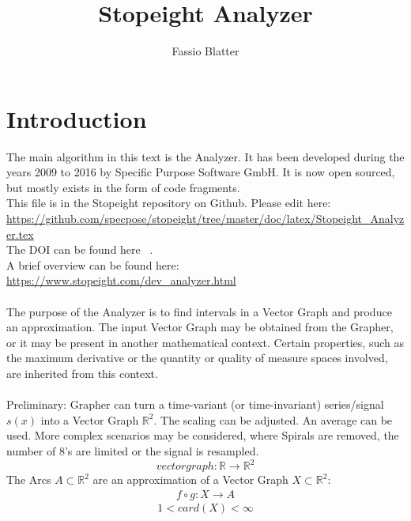 \documentclass{report}
\begin{document}
\title{Stopeight Analyzer}
\author{Fassio Blatter}
\maketitle

\chapter{Introduction}
The main algorithm in this text is the Analyzer. It has been developed during the years 2009 to 2016 by Specific Purpose Software GmbH. It is now open sourced, but mostly exists in the form of code fragments.\\
This file is in the Stopeight repository on Github. Please edit here:\\
\href{https://github.com/specpose/stopeight/tree/master/doc/latex/Stopeight\_Analyzer.tex}{https://github.com/specpose/stopeight/tree/master/doc/latex/Stopeight\_Analyzer.tex}\\
The DOI can be found here ~\cite{Stopeight}.\\
A brief overview can be found here:\\
\href{https://www.stopeight.com/dev_analyzer.html}{https://www.stopeight.com/dev\_analyzer.html}\\\\
The purpose of the Analyzer is to find intervals in a Vector Graph and produce an approximation. The input Vector Graph may be obtained from the Grapher, or it may be present in another mathematical context. Certain properties, such as the maximum derivative or the quantity or quality of measure spaces involved, are inherited from this context.\\\\
Preliminary: Grapher can turn a time-variant (or time-invariant) series/signal $s(x)$ into a Vector Graph $\mathbb{R}^2$. The scaling can be adjusted. An average can be used. More complex scenarios may be considered, where Spirals are removed, the number of 8's are limited or the signal is resampled.
\begin{equation}
vectorgraph: \mathbb{R} \rightarrow \mathbb{R}^2
\end{equation}
The Arcs $A \subset \mathbb{R}^2$ are an approximation of a Vector Graph $X \subset \mathbb{R}^2$:
\begin{align}
f \circ g: X \rightarrow A
\end{align}
\begin{equation*}
1 < card(X) < \infty
\end{equation*}
\end{document}
